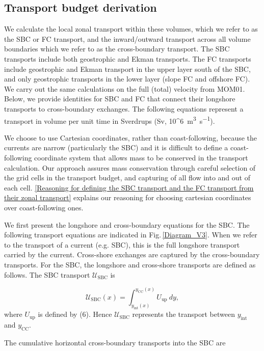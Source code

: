 \documentclass[preprint,3p,review,12pt]{elsarticle}
\newcommand{\sub}[1]{_{\text{#1}}}
\begin{document}
\subsection{Transport budget derivation} \label{Transport budget derivation}
We calculate the local zonal transport within these volumes,
which we refer to as the SBC or FC transport, and the inward/outward transport across all volume boundaries which we refer to as the cross-boundary transport. The SBC transports include both geostrophic and Ekman transports. The FC transports include geostrophic and Ekman transport in the upper layer south of the SBC, and only geostrophic transports in the lower layer (slope FC and offshore FC).
We carry out the same calculations on the full (total) velocity from MOM01.
Below, we provide identities for SBC and FC that connect their longshore transports to cross-boundary exchanges. The following equations represent a transport in volume per unit time in Sverdrups (\si{Sv},  \SI[parse-numbers=false]{10^6}{\cubic\meter\per\second}).

We choose to use Cartesian coordinates, rather than coast-following, because the currents are narrow (particularly the SBC) and it is difficult to define a coast-following coordinate system that allows mass to be conserved in the transport calculation. Our approach assures mass conservation through careful selection of the grid cells in the transport budget, and capturing of all flow into and out of each cell. \ref{Reasoning for defining the SBC transport and the FC transport from their zonal transport} explains our reasoning for choosing cartesian coordinates over coast-following ones.

We first present the longshore and cross-boundary equations for the SBC\@. The following transport equations are indicated in Fig.\,\ref{Diagram_V3}. When we refer to the transport of a current (e.g. SBC), this is the full longshore transport carried by the current. Cross-shore exchanges are captured by the cross-boundary transports. For the SBC, the longshore and cross-shore transports are defined as follows. The SBC transport $\mathcal{U}\sub{SBC}$ is 

\begin{equation} \label{eq:3}
\mathcal{U}\sub{SBC}(x) = \int_{y\sub{int}(x)}^{y\sub{CC}(x)}{U}\sub{up}\ dy,
\end{equation}
%
where $U\sub{up}$ is defined by (6). Hence $\mathcal{U}\sub{SBC}$ represents the transport between $y\sub{int}$ and $y\sub{CC}$. 

The cumulative horizontal cross-boundary transports into the SBC are 
\end{document}
